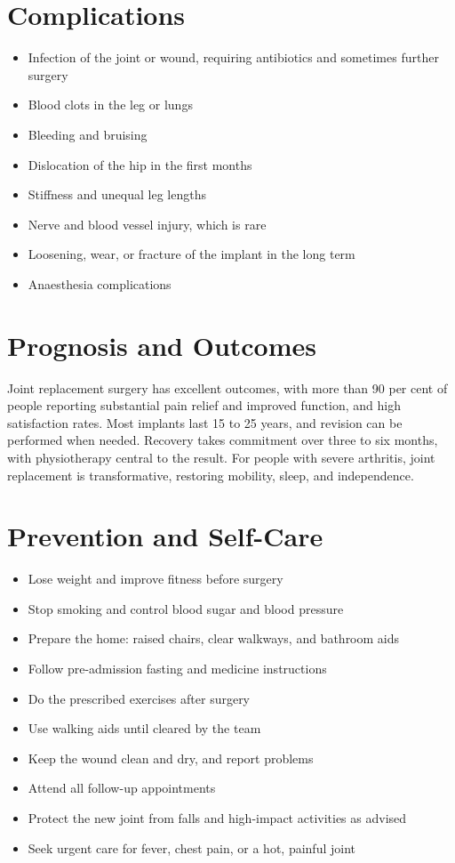 \section*{Complications}
\begin{itemize}
    \item Infection of the joint or wound, requiring antibiotics and sometimes further surgery
    \item Blood clots in the leg or lungs
    \item Bleeding and bruising
    \item Dislocation of the hip in the first months
    \item Stiffness and unequal leg lengths
    \item Nerve and blood vessel injury, which is rare
    \item Loosening, wear, or fracture of the implant in the long term
    \item Anaesthesia complications
\end{itemize}

\section*{Prognosis and Outcomes}
Joint replacement surgery has excellent outcomes, with more than 90 per cent of people reporting substantial pain relief and improved function, and high satisfaction rates. Most implants last 15 to 25 years, and revision can be performed when needed. Recovery takes commitment over three to six months, with physiotherapy central to the result. For people with severe arthritis, joint replacement is transformative, restoring mobility, sleep, and independence.

\section*{Prevention and Self-Care}
\begin{itemize}
    \item Lose weight and improve fitness before surgery
    \item Stop smoking and control blood sugar and blood pressure
    \item Prepare the home: raised chairs, clear walkways, and bathroom aids
    \item Follow pre-admission fasting and medicine instructions
    \item Do the prescribed exercises after surgery
    \item Use walking aids until cleared by the team
    \item Keep the wound clean and dry, and report problems
    \item Attend all follow-up appointments
    \item Protect the new joint from falls and high-impact activities as advised
    \item Seek urgent care for fever, chest pain, or a hot, painful joint
\end{itemize}

